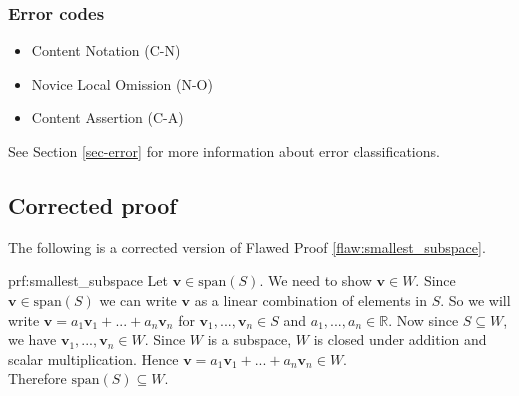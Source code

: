 \subsubsection{Error codes}
\begin{itemize}
    \item Content Notation (C-N)
	\item Novice Local Omission (N-O)
	\item Content Assertion (C-A)
\end{itemize}
See Section \ref{sec-error} for more information about error classifications.

\clearpage
\subsection{Corrected proof}

The following is a corrected version of Flawed Proof \ref{flaw:smallest_subspace}. %

\begin{prf}{prf:smallest_subspace} %
Let $\bm{v} \in \text{span}(S)$. We need to show $\bm{v} \in W$. Since $\bm{v} \in \text{span}(S)$ we can write $\bm{v}$ as a linear combination of elements in $S$. So we will write $\bm{v} = a_1\bm{v}_1 + ... + a_n\bm{v}_n$ for $\bm{v}_1, ..., \bm{v}_n \in S$ and $a_1, ..., a_n \in \mathbb{R}$. Now since $S \subseteq W$, we have $\bm{v}_1, ..., \bm{v}_n \in W$. Since $W$ is a subspace, $W$ is closed under addition and scalar multiplication. Hence $\bm{v} = a_1\bm{v}_1 + ... + a_n\bm{v}_n \in W$. \\

Therefore $\text{span}(S) \subseteq W$.
\end{prf} 